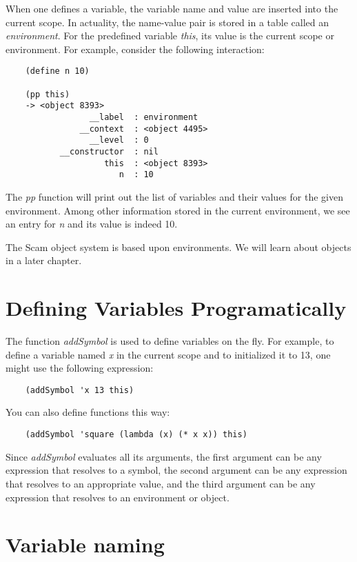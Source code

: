 When one defines a variable, the variable name and value are
inserted into the current scope. In actuality,
the name-value pair is
stored in a table called an {\it environment}. For the predefined
variable {\it this}, its value is the current scope or environment.
For example, consider the following interaction:

\begin{verbatim}
    (define n 10)

    (pp this)
    -> <object 8393>
                 __label  : environment
               __context  : <object 4495>
                 __level  : 0
           __constructor  : nil
                    this  : <object 8393>
                       n  : 10
\end{verbatim}

The {\it pp} function will print out the list of variables
and their values for the given environment.
Among other information stored in the current environment,
we see an entry for {\it n} and its value is indeed 10.

The Scam object system is based upon environments. We will
learn about objects in a later chapter.

\section{Defining Variables Programatically}

The function {\it addSymbol} is used to define variables on the 
fly. For example, to define a variable named {\it x} in the current
scope and to initialized it to 13, one might use the
following expression:

\begin{verbatim}
    (addSymbol 'x 13 this)
\end{verbatim}

You can also define functions this way:

\begin{verbatim}
    (addSymbol 'square (lambda (x) (* x x)) this)
\end{verbatim}

Since {\it addSymbol} evaluates all its arguments, the first
argument can be any expression that resolves to a symbol,
the second argument can be any expression that resolves
to an appropriate value, and the third argument can
be any expression that resolves to an environment or
object.


\section{Variable naming}

